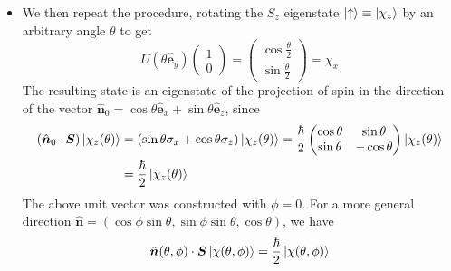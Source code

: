 \documentclass[11pt, a4paper]{article}
\renewcommand{\vec}[1]{\bm{#1}}  %
\newcommand{\uvec}[1]{\hat{\vec{#1}}}  %
\newcommand{\ua}{\uparrow}  %
\renewcommand{\S}{\vec{S}}  %
\begin{document}
\begin{itemize}
	\item We then repeat the procedure, rotating the $ S_{z} $ eigenstate $ \ket{\ua} \equiv \ket{\chi_{z}} $ by an arbitrary angle $ \theta $ to get
	\begin{equation*}
		U(\theta \uvec{e}_{y})
		\begin{pmatrix}
			1\\
			0
		\end{pmatrix}
		=
		\begin{pmatrix}
			\cos \frac{\theta}{2}\\
			\sin \frac{\theta}{2}
		\end{pmatrix}
		= \chi_{x}
	\end{equation*}
	The resulting state is an eigenstate of the projection of spin in the direction of the vector $ \uvec{n}_{0} = \cos \theta \uvec{e}_{x} + \sin \theta \uvec{e}_{z} $, since
	\begin{align*}
		(\uvec{n}_{0}\cdot \vec{S})\ket{\chi_{z}(\theta)} &= (\sin \theta \sigma_{x} + \cos \theta \sigma_{z})\ket{\chi_{z}(\theta)} = \frac{\hbar}{2}
		\begin{pmatrix}
			\cos \theta & \sin \theta\\
			\sin \theta & - \cos \theta
		\end{pmatrix}
		\ket{\chi_{z}(\theta)}\\
		& = \frac{\hbar}{2}\ket{\chi_{z}(\theta)}
	\end{align*}
	The above unit vector was constructed with $ \phi = 0 $. For a more general direction $ \uvec{n} = (\cos \phi \sin \theta, \sin \phi \sin \theta, \cos \theta) $, we have
	\begin{equation*}
		\uvec{n}(\theta, \phi) \cdot \S \ket{\chi(\theta, \phi)} = \frac{\hbar}{2} \ket{\chi(\theta, \phi)}
	\end{equation*}
	

\end{itemize}
\end{document}
